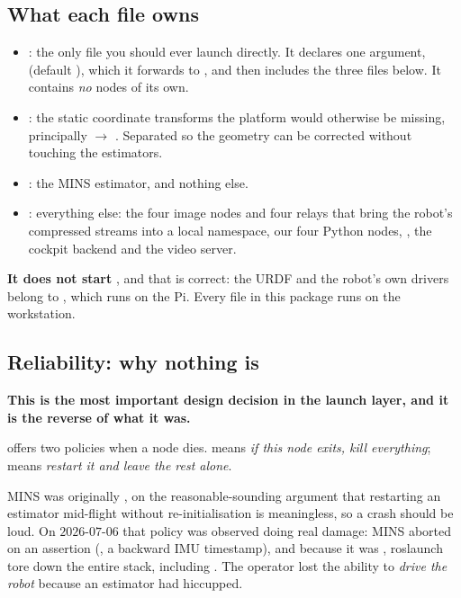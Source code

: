 \subsection{What each file owns}
\begin{itemize}[leftmargin=1.4em]
\item {}: the only file you should ever launch
  directly. It declares one argument,  (default ), which
  it forwards to , and then includes the three files below. It
  contains \emph{no} nodes of its own.
\item {}: the static coordinate transforms
  the platform would otherwise be missing, principally
   $\rightarrow$ . Separated so the geometry
  can be corrected without touching the estimators.
\item {}: the MINS estimator, and nothing else.
\item {}: everything else: the four image
   nodes and four  relays that bring the
  robot's compressed streams into a local namespace, our four Python nodes,
  , the cockpit backend and the video server.
\end{itemize}

\noindent \textbf{It does not start }, and that is
correct: the URDF and the robot's own drivers belong to
, which runs on the Pi. Every file in this package
runs on the workstation.

\subsection{Reliability: why nothing is }
\label{ap:repro-respawn}
\textbf{This is the most important design decision in the launch layer, and it
is the reverse of what it was.}

 offers two policies when a node dies.
 means \emph{if this node exits, kill everything};
 means \emph{restart it and leave the rest alone}.

MINS was originally , on the reasonable-sounding argument
that restarting an estimator mid-flight without re-initialisation is
meaningless, so a crash should be loud. On $2026$-$07$-$06$ that policy was
observed doing real damage: MINS aborted on an assertion
(, a backward IMU timestamp), and because it was
, roslaunch tore down the entire stack, including
. The operator lost the ability to \emph{drive the robot}
because an estimator had hiccupped.

